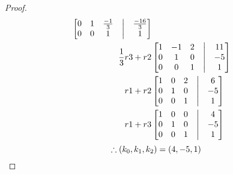 \documentclass[12pt]{article}
\begin{document}
\begin{enumerate}
\begin{enumerate}
\begin{proof}
\begin{align*}
\begin{bmatrix}
                                                    0 & 1  & \frac{-1}{3} & \bigm| & \frac{-16}{3} \\
                                                    0 & 0  & 1            & \bigm| & 1             \\
                                            \end{bmatrix} \\
                                            \frac{1}{3}r3+r2
                                             &
                                            \begin{bmatrix}
                                                    1 & -1 & 2 & \bigm| & 11 \\
                                                    0 & 1  & 0 & \bigm| & -5 \\
                                                    0 & 0  & 1 & \bigm| & 1  \\
                                            \end{bmatrix} \\
                                            r1 + r2
                                             &
                                            \begin{bmatrix}
                                                    1 & 0 & 2 & \bigm| & 6  \\
                                                    0 & 1 & 0 & \bigm| & -5 \\
                                                    0 & 0 & 1 & \bigm| & 1  \\
                                            \end{bmatrix} \\
                                            r1 + r3
                                             &
                                            \begin{bmatrix}
                                                    1 & 0 & 0 & \bigm| & 4  \\
                                                    0 & 1 & 0 & \bigm| & -5 \\
                                                    0 & 0 & 1 & \bigm| & 1  \\
                                            \end{bmatrix}
                                    \end{align*}
                                    \begin{equation*}
                                            \therefore (k_{0}, k_{1}, k_{2}) = (4, -5, 1) \\
                                    \end{equation*}
                            \end{proof}
                            \pagebreak

\end{enumerate}
\end{enumerate}
\end{document}
